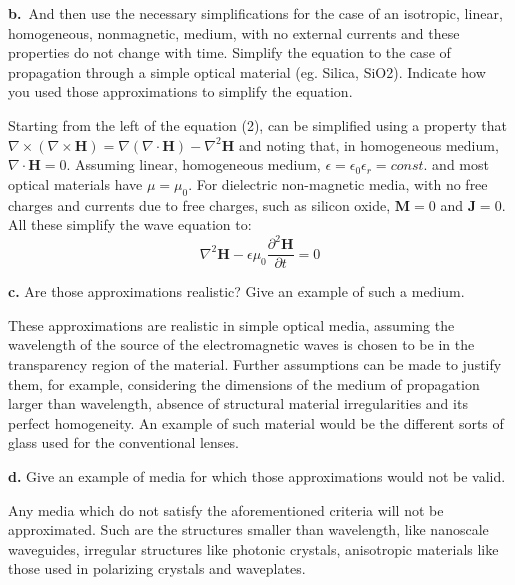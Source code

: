 \documentclass[11pt,a4paper]{article}
\begin{document}
\begin{displayquote}
\textbf{b.}~And then use the necessary simplifications for the case of an isotropic, linear, homogeneous, nonmagnetic, medium, with no external currents and these properties do not change with time. Simplify the equation to the case of propagation through a simple optical material (eg. Silica, SiO2). Indicate how you used those approximations to simplify the equation.
\end{displayquote}
Starting from the left of the equation (2), can be simplified using a property that $\nabla\times(\nabla\times\textbf{H})=\nabla{}(\nabla\cdot\textbf{H})-\nabla^2\textbf{H}$ and noting that, in homogeneous medium, $\nabla\cdot\textbf{H}=0$. Assuming linear, homogeneous medium, $\epsilon=\epsilon_0{}\epsilon_r=const.$ and most optical materials have $\mu=\mu_0$. For dielectric non-magnetic media,  with no free charges and currents due to free charges, such as silicon oxide, $\textbf{M}=0$ and $\textbf{J}=0$. All these simplify the wave equation to:
\begin{equation}
    \nabla^2\textbf{H}-\epsilon\mu_0\frac{\partial^2\textbf{H}}{\partial{t}}=0
\end{equation}

\begin{displayquote}
    \textbf{c.} Are those approximations realistic? Give an example of such a medium. 
\end{displayquote}

These approximations are realistic in simple optical media, assuming the wavelength of the source of the electromagnetic waves is chosen to be in the transparency region of the material. Further assumptions can be made to justify them, for example, considering the dimensions of the medium of propagation larger than wavelength, absence of structural material irregularities and its perfect homogeneity. An example of such material would be the different sorts of glass used for the conventional lenses.    

\begin{displayquote}
    \textbf{d.} Give an example of media for which those approximations would not be valid.
\end{displayquote}

Any media which do not satisfy the aforementioned criteria will not be approximated. Such are the structures smaller than wavelength, like nanoscale waveguides, irregular structures like photonic crystals, anisotropic materials like those used in polarizing crystals and waveplates.
\end{document}
